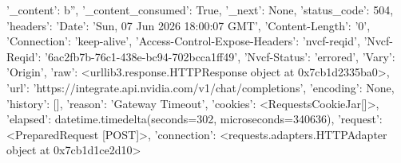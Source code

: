 
{'_content': b'', '_content_consumed': True, '_next': None, 'status_code': 504, 'headers': {'Date': 'Sun, 07 Jun 2026 18:00:07 GMT', 'Content-Length': '0', 'Connection': 'keep-alive', 'Access-Control-Expose-Headers': 'nvcf-reqid', 'Nvcf-Reqid': '6ac2fb7b-76c1-438e-bc94-702bcca1ff49', 'Nvcf-Status': 'errored', 'Vary': 'Origin'}, 'raw': <urllib3.response.HTTPResponse object at 0x7cb1d2335ba0>, 'url': 'https://integrate.api.nvidia.com/v1/chat/completions', 'encoding': None, 'history': [], 'reason': 'Gateway Timeout', 'cookies': <RequestsCookieJar[]>, 'elapsed': datetime.timedelta(seconds=302, microseconds=340636), 'request': <PreparedRequest [POST]>, 'connection': <requests.adapters.HTTPAdapter object at 0x7cb1d1ce2d10>}
